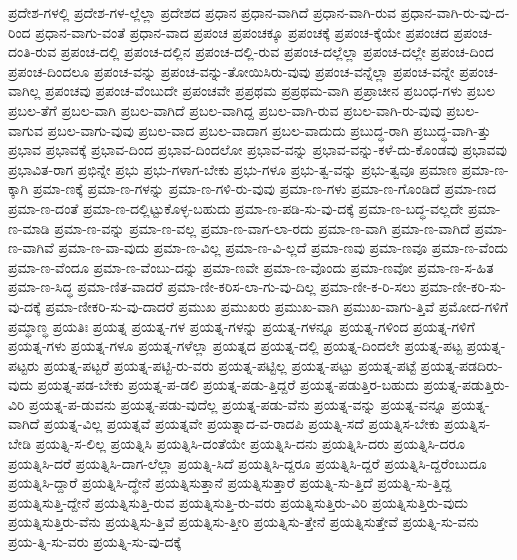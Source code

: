 {ಪ್ರದೇಶ-ಗಳಲ್ಲಿ
ಪ್ರದೇಶ-ಗಳ-ಲ್ಲೆಲ್ಲಾ
ಪ್ರದೇಶದ
ಪ್ರಧಾನ
ಪ್ರಧಾನ-ವಾಗಿದೆ
ಪ್ರಧಾನ-ವಾಗಿ-ರುವ
ಪ್ರಧಾನ-ವಾಗಿ-ರು-ವು-ದ-ರಿಂದ
ಪ್ರಧಾನ-ವಾಗು-ವಂತೆ
ಪ್ರಧಾನ-ವಾದ
ಪ್ರಪಂಚ
ಪ್ರಪಂಚಕ್ಕೂ
ಪ್ರಪಂಚಕ್ಕೆ
ಪ್ರಪಂಚ-ಕ್ಕೆಯೇ
ಪ್ರಪಂಚದ
ಪ್ರಪಂಚ-ದಂತಿ-ರುವ
ಪ್ರಪಂಚ-ದಲ್ಲಿ
ಪ್ರಪಂಚ-ದಲ್ಲಿನ
ಪ್ರಪಂಚ-ದಲ್ಲಿ-ರುವ
ಪ್ರಪಂಚ-ದಲ್ಲೆಲ್ಲಾ
ಪ್ರಪಂಚ-ದಲ್ಲೇ
ಪ್ರಪಂಚ-ದಿಂದ
ಪ್ರಪಂಚ-ದಿಂದಲೂ
ಪ್ರಪಂಚ-ವನ್ನು
ಪ್ರಪಂಚ-ವನ್ನು-ತೋಯಿಸಿರು-ವುವು
ಪ್ರಪಂಚ-ವನ್ನೆಲ್ಲಾ
ಪ್ರಪಂಚ-ವನ್ನೇ
ಪ್ರಪಂಚ-ವಾಗಿಲ್ಲ
ಪ್ರಪಂಚವು
ಪ್ರಪಂಚ-ವೆಂಬುದೇ
ಪ್ರಪಂಚವೇ
ಪ್ರಪ್ರಥಮ
ಪ್ರಪ್ರಥಮ-ವಾಗಿ
ಪ್ರಪ್ರಾಚೀನ
ಪ್ರಬಂಧ-ಗಳು
ಪ್ರಬಲ
ಪ್ರಬಲ-ತೆಗೆ
ಪ್ರಬಲ-ವಾಗಿ
ಪ್ರಬಲ-ವಾಗಿದೆ
ಪ್ರಬಲ-ವಾಗಿದ್ದ
ಪ್ರಬಲ-ವಾಗಿ-ರುವ
ಪ್ರಬಲ-ವಾಗಿ-ರು-ವುವು
ಪ್ರಬಲ-ವಾಗುವ
ಪ್ರಬಲ-ವಾಗು-ವುವು
ಪ್ರಬಲ-ವಾದ
ಪ್ರಬಲ-ವಾದಾಗ
ಪ್ರಬಲ-ವಾದುದು
ಪ್ರಬುದ್ಧ-ರಾಗಿ
ಪ್ರಬುದ್ಧ-ವಾಗಿ-ತ್ತು
ಪ್ರಭಾವ
ಪ್ರಭಾವಕ್ಕೆ
ಪ್ರಭಾವ-ದಿಂದ
ಪ್ರಭಾವ-ದಿಂದಲೋ
ಪ್ರಭಾವ-ವನ್ನು
ಪ್ರಭಾವ-ವನ್ನು-ಕಳೆ-ದು-ಕೊಂಡವು
ಪ್ರಭಾವವು
ಪ್ರಭಾವಿತ-ರಾಗ
ಪ್ರಭಿನ್ನೇ
ಪ್ರಭು
ಪ್ರಭು-ಗಳಾಗ-ಬೇಕು
ಪ್ರಭು-ಗಳೂ
ಪ್ರಭು-ತ್ವ-ವನ್ನು
ಪ್ರಭು-ತ್ವವೂ
ಪ್ರಮಾಣ
ಪ್ರಮಾ-ಣ-ಕ್ಕಾಗಿ
ಪ್ರಮಾ-ಣಕ್ಕೆ
ಪ್ರಮಾ-ಣ-ಗಳನ್ನು
ಪ್ರಮಾ-ಣ-ಗಳಿ-ರು-ವುವು
ಪ್ರಮಾ-ಣ-ಗಳು
ಪ್ರಮಾ-ಣ-ಗೊಂಡಿದೆ
ಪ್ರಮಾ-ಣದ
ಪ್ರಮಾ-ಣ-ದಂತೆ
ಪ್ರಮಾ-ಣ-ದಲ್ಲಿಟ್ಟುಕೊಳ್ಳ-ಬಹುದು
ಪ್ರಮಾ-ಣ-ಪಡಿ-ಸು-ವು-ದಕ್ಕೆ
ಪ್ರಮಾ-ಣ-ಬದ್ಧ-ವಲ್ಲದೇ
ಪ್ರಮಾ-ಣ-ಮಾಡಿ
ಪ್ರಮಾ-ಣ-ವನ್ನು
ಪ್ರಮಾ-ಣ-ವಲ್ಲ
ಪ್ರಮಾ-ಣ-ವಾಗ-ಲಾ-ರದು
ಪ್ರಮಾ-ಣ-ವಾಗಿ
ಪ್ರಮಾ-ಣ-ವಾಗಿದೆ
ಪ್ರಮಾ-ಣ-ವಾಗಿವೆ
ಪ್ರಮಾ-ಣ-ವಾ-ವುದು
ಪ್ರಮಾ-ಣ-ವಿಲ್ಲ
ಪ್ರಮಾ-ಣ-ವಿ-ಲ್ಲದೆ
ಪ್ರಮಾ-ಣವು
ಪ್ರಮಾ-ಣವೂ
ಪ್ರಮಾ-ಣ-ವೆಂದು
ಪ್ರಮಾ-ಣ-ವೆಂದೂ
ಪ್ರಮಾ-ಣ-ವೆಂಬು-ದನ್ನು
ಪ್ರಮಾ-ಣವೇ
ಪ್ರಮಾ-ಣ-ವೊಂದು
ಪ್ರಮಾ-ಣವೋ
ಪ್ರಮಾ-ಣ-ಸ-ಹಿತ
ಪ್ರಮಾ-ಣ-ಸಿದ್ಧ
ಪ್ರಮಾ-ಣಿತ-ವಾದರೆ
ಪ್ರಮಾ-ಣೀ-ಕರಿಸ-ಲಾ-ಗು-ವು-ದಿಲ್ಲ
ಪ್ರಮಾ-ಣೀ-ಕ-ರಿ-ಸಲು
ಪ್ರಮಾ-ಣೀ-ಕರಿ-ಸು-ವು-ದಕ್ಕೆ
ಪ್ರಮಾ-ಣೀಕರಿ-ಸು-ವು-ದಾದರೆ
ಪ್ರಮುಖ
ಪ್ರಮುಖರು
ಪ್ರಮುಖ-ವಾಗಿ
ಪ್ರಮುಖ-ವಾಗು-ತ್ತಿವೆ
ಪ್ರಮೋದ-ಗಳಿಗೆ
ಪ್ರಮ್ಧಾಣ್ಧ
ಪ್ರಯತಿಃ
ಪ್ರಯತ್ನ
ಪ್ರಯತ್ನ-ಗಳ
ಪ್ರಯತ್ನ-ಗಳನ್ನು
ಪ್ರಯತ್ನ-ಗಳನ್ನೂ
ಪ್ರಯತ್ನ-ಗಳಿಂದ
ಪ್ರಯತ್ನ-ಗಳಿಗೆ
ಪ್ರಯತ್ನ-ಗಳು
ಪ್ರಯತ್ನ-ಗಳೂ
ಪ್ರಯತ್ನ-ಗಳೆಲ್ಲಾ
ಪ್ರಯತ್ನದ
ಪ್ರಯತ್ನ-ದಲ್ಲಿ
ಪ್ರಯತ್ನ-ದಿಂದಲೇ
ಪ್ರಯತ್ನ-ಪಟ್ಟ
ಪ್ರಯತ್ನ-ಪಟ್ಟರು
ಪ್ರಯತ್ನ-ಪಟ್ಟರೆ
ಪ್ರಯತ್ನ-ಪಟ್ಟಿ-ರು-ವರು
ಪ್ರಯತ್ನ-ಪಟ್ಟಿಲ್ಲ
ಪ್ರಯತ್ನ-ಪಟ್ಟು
ಪ್ರಯತ್ನ-ಪಟ್ಟೆ
ಪ್ರಯತ್ನ-ಪಡದಿರು-ವುದು
ಪ್ರಯತ್ನ-ಪಡ-ಬೇಕು
ಪ್ರಯತ್ನ-ಪ-ಡಲಿ
ಪ್ರಯತ್ನ-ಪಡು-ತ್ತಿದ್ದರೆ
ಪ್ರಯತ್ನ-ಪಡುತ್ತಿರ-ಬಹುದು
ಪ್ರಯತ್ನ-ಪಡುತ್ತಿರು-ವಿರಿ
ಪ್ರಯತ್ನ-ಪ-ಡುವನು
ಪ್ರಯತ್ನ-ಪಡು-ವುದೆಲ್ಲ
ಪ್ರಯತ್ನ-ಪಡು-ವೆನು
ಪ್ರಯತ್ನ-ವನ್ನು
ಪ್ರಯತ್ನ-ವನ್ನೂ
ಪ್ರಯತ್ನ-ವಾಗಿದೆ
ಪ್ರಯತ್ನ-ವಿಲ್ಲ
ಪ್ರಯತ್ನವೆ
ಪ್ರಯತ್ನವೇ
ಪ್ರಯತ್ನಾದ-ವ-ರಾದಪಿ
ಪ್ರಯತ್ನಿ-ಸದೆ
ಪ್ರಯತ್ನಿಸ-ಬೇಕು
ಪ್ರಯತ್ನಿಸ-ಬೇಡಿ
ಪ್ರಯತ್ನಿ-ಸ-ಲಿಲ್ಲ
ಪ್ರಯತ್ನಿಸಿ
ಪ್ರಯತ್ನಿಸಿ-ದಂತೆಯೇ
ಪ್ರಯತ್ನಿಸಿ-ದನು
ಪ್ರಯತ್ನಿಸಿ-ದರು
ಪ್ರಯತ್ನಿಸಿ-ದರೂ
ಪ್ರಯತ್ನಿಸಿ-ದರೆ
ಪ್ರಯತ್ನಿಸಿ-ದಾಗ-ಲೆಲ್ಲಾ
ಪ್ರಯತ್ನಿ-ಸಿದೆ
ಪ್ರಯತ್ನಿಸಿ-ದ್ದರೂ
ಪ್ರಯತ್ನಿಸಿ-ದ್ದರೆ
ಪ್ರಯತ್ನಿಸಿ-ದ್ದರೆಂಬುದೂ
ಪ್ರಯತ್ನಿಸಿ-ದ್ದಾರೆ
ಪ್ರಯತ್ನಿಸಿ-ದ್ಧೇನೆ
ಪ್ರಯತ್ನಿಸುತ್ತಾನೆ
ಪ್ರಯತ್ನಿಸುತ್ತಾರೆ
ಪ್ರಯತ್ನಿ-ಸು-ತ್ತಿದೆ
ಪ್ರಯತ್ನಿ-ಸು-ತ್ತಿದ್ದ
ಪ್ರಯತ್ನಿಸುತ್ತಿ-ದ್ದೇನೆ
ಪ್ರಯತ್ನಿಸುತ್ತಿ-ರುವ
ಪ್ರಯತ್ನಿಸುತ್ತಿ-ರು-ವರು
ಪ್ರಯತ್ನಿಸುತ್ತಿರು-ವಿರಿ
ಪ್ರಯತ್ನಿಸುತ್ತಿರು-ವುದು
ಪ್ರಯತ್ನಿಸುತ್ತಿರು-ವೆನು
ಪ್ರಯತ್ನಿಸು-ತ್ತಿವೆ
ಪ್ರಯತ್ನಿಸು-ತ್ತೀರಿ
ಪ್ರಯತ್ನಿಸು-ತ್ತೇನೆ
ಪ್ರಯತ್ನಿಸುತ್ತೇವೆ
ಪ್ರಯತ್ನಿ-ಸು-ವನು
ಪ್ರಯ-ತ್ನಿ-ಸು-ವರು
ಪ್ರಯತ್ನಿ-ಸು-ವು-ದಕ್ಕೆ
}
